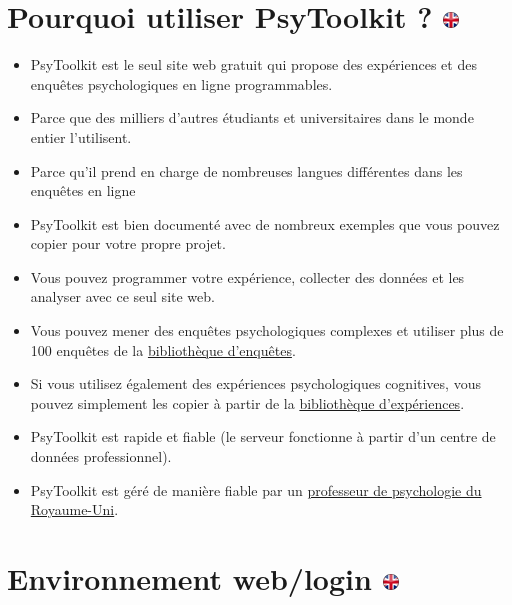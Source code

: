\documentclass[
]{book}
\providecommand{\tightlist}{%
  \setlength{\itemsep}{0pt}\setlength{\parskip}{0pt}}
\begin{document}
\hypertarget{pourquoi-utiliser-psytoolkit}{%
\section[Pourquoi utiliser PsyToolkit ? ]{\texorpdfstring{Pourquoi utiliser PsyToolkit ? \href{https://www.psytoolkit.org/\#_why_use_psytoolkit}{\protect\includegraphics{img/ukflag.png}}}{Pourquoi utiliser PsyToolkit ? }}\label{pourquoi-utiliser-psytoolkit}}

\begin{itemize}
\tightlist
\item
  PsyToolkit est le seul site web gratuit qui propose des expériences et des enquêtes psychologiques en ligne programmables.
\item
  Parce que des milliers d'autres étudiants et universitaires dans le monde entier l'utilisent.
\item
  Parce qu'il prend en charge de nombreuses langues différentes dans les enquêtes en ligne
\item
  PsyToolkit est bien documenté avec de nombreux exemples que vous pouvez copier pour votre propre projet.
\item
  Vous pouvez programmer votre expérience, collecter des données et les analyser avec ce seul site web.
\item
  Vous pouvez mener des enquêtes psychologiques complexes et utiliser plus de 100 enquêtes de la \href{https://www.psytoolkit.org/survey-library}{bibliothèque d'enquêtes}.
\item
  Si vous utilisez également des expériences psychologiques cognitives, vous pouvez simplement les copier à partir de la \href{https://www.psytoolkit.org/experiment-library}{bibliothèque d'expériences}.
\item
  PsyToolkit est rapide et fiable (le serveur fonctionne à partir d'un centre de données professionnel).
\item
  PsyToolkit est géré de manière fiable par un \href{https://www.psytoolkit.org/contact.html}{professeur de psychologie du Royaume-Uni}.
\end{itemize}

\hypertarget{environnement-weblogin}{%
\section[Environnement web/login ]{\texorpdfstring{Environnement web/login \href{https://www.psytoolkit.org/\#_web_based_login}{\protect\includegraphics{img/ukflag.png}}}{Environnement web/login }}\label{environnement-weblogin}}
\end{document}
